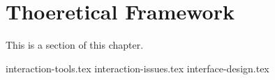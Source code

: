 
\section{Thoeretical Framework}
This is a section of this chapter.

{interaction-tools.tex}
{interaction-issues.tex}
{interface-design.tex}
